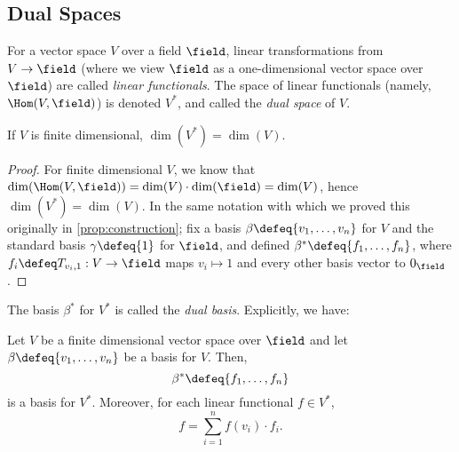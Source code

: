 \subsection{Dual Spaces}

\begin{definition}
For a vector space $V$ over a field $\field$, linear transformations from $V \to \field$ (where we view $\field$ as a one-dimensional vector space over $\field$) are called \emph{linear functionals}. The space of linear functionals (namely, $\Hom(V, \field)$) is denoted $V^\ast$, and called the \emph{dual space} of $V$.
\end{definition}

\begin{proposition}
    If $V$ is finite dimensional, $\dim(V^\ast) = \dim(V)$.\footnotemark
\end{proposition}
\begin{proof}
    For finite dimensional $V$, we know that $\dim(\Hom(V, \field)) = \dim(V) \cdot \dim(\field) = \dim(V)$, hence $\dim(V^*) = \dim(V)$. In the same notation with which we proved this originally in \cref{prop:construction}; fix a basis $\beta \defeq \{v_1, \dots, v_n\}$ for $V$ and the standard basis $\gamma \defeq \{1\}$ for $\field$, and defined $\beta^\ast \defeq \{f_1, \dots, f_n\}$, where $f_i \defeq T_{v_i, 1} : V \to \field$ maps $v_i \mapsto 1$ and every other basis vector to $0_\field$.
\end{proof}

\begin{remark}
The basis $\beta^\ast$ for $V^\ast$ is called the \emph{dual basis}. Explicitly, we have:
\end{remark}

\begin{corollary}
    Let $V$ be a finite dimensional vector space over $\field$ and let $\beta \defeq \{v_1, \dots, v_n\}$ be a basis for $V$. Then,\[
    \beta^\ast \defeq \{f_1, \dots, f_n\}    
    \]
    is a basis for $V^\ast$. Moreover, for each linear functional $f \in V^\ast$, \[    
    f = \sum_{i=1}^n f(v_i)\cdot f_i.
    \]
\end{corollary}

